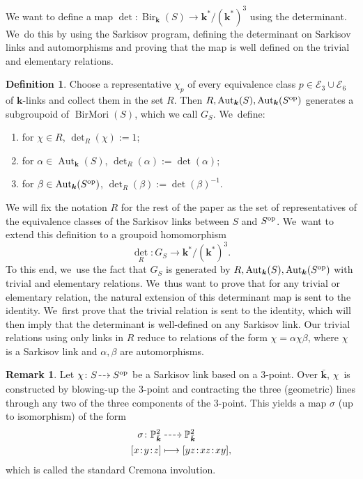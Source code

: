 \documentclass[JEP,XML,SOM,Unicode,NoFloatCountersInSection, NoEqCountersInSection,published]{cedram}
\newcommand{\dradpl}{{\hspace*{-2mm}\begin{tikzcd}[ampersand replacement=\&,column sep = scriptsize]\mbox{}\ar[r,dashed]\&\mbox{}\end{tikzcd}\hspace*{-2mm}}}
\newcommand{\dratst}{{\hspace*{-2.5mm}\begin{tikzcd}[ampersand replacement=\&,column sep = small]\mbox{}\ar[r,dashed]\&\mbox{}\end{tikzcd}\hspace*{-2mm}}}
\let\drascst\dratst
\newcommand{\dra}{\mathchoice{\dradpl}{\dratst}{\drascst}{\drascst}}
\newcommand\mto{\mathchoice{\longmapsto}{\mapsto}{\mapsto}{\mapsto}}
\newcommand{\op}{\textup{op}}
\newcommand{\sep}{\mkern2mu{:}\mkern2mu}
\theoremstyle{definition}
\newtheorem{definition}[theorem]{Definition}
\newtheorem{remark}[theorem]{Remark}
\newcommand{\kk}{{\boldsymbol{k}}}
\DeclareMathOperator{\Bir}{Bir}
\DeclareMathOperator{\Aut}{Aut}
\DeclareMathOperator{\BirMori}{BirMori}
\begin{document}
We want to define a map $\det \colon \Bir_{\kk}(S) \to \kk^* / (\kk^*)^3$ using the determinant. We~do this by using the Sarkisov program, \ie defining the determinant on Sarkisov links and automorphisms and proving that the map is well defined on the trivial and elementary relations.

\begin{definition}
Choose a representative $\chi_p$ of every equivalence class $p \in \mathcal{E}_3 \cup \mathcal{E}_6$ of $\kk$-links and collect them in the set $R$. Then $R,\Aut_{\kk}(S),\Aut_{\kk}(S^{\op})$ generates a subgroupoid of $\BirMori(S)$, which we call $G_S$. We~define:
\begin{enumerate}
\item for $\chi \in R$, $\det_R(\chi) := 1$;
\item for $\alpha \in \Aut_{\kk}(S)$, $\det_R(\alpha) := \det(\alpha)$;
\item for $\beta \in \Aut_{\kk}(S^{\op})$, $\det_R(\beta) := \det(\beta)^{-1}$.
\end{enumerate}
\end{definition}
We will fix the notation $R$ for the rest of the paper as the set of representatives of the equivalence classes of the Sarkisov links between $S$ and $S^{\op}$. We~want to extend this definition to a groupoid homomorphism
\[
\det_R\colon G_S \to \kk^*/(\kk^*)^3.
\]
To this end, we~use the fact that $G_S$ is generated by $R, \Aut_{\kk}(S), \Aut_{\kk}(S^{\op})$ with trivial and elementary relations. We~thus want to prove that for any trivial or elementary relation, the natural extension of this determinant map is sent to the identity. We~first prove that the trivial relation is sent to the identity, which will then imply that the determinant is well-defined on any Sarkisov link. Our trivial relations using only links in $R$ reduce to relations of the form $\chi = \alpha \chi \beta$, where $\chi$ is a Sarkisov link and $\alpha, \beta$ are automorphisms.

\begin{remark}
Let $\chi\colon S \dra S^{\op}$ be a Sarkisov link based on a $3$\nobreakdash-point. Over $\bar{\kk}$, $\chi$~is constructed by blowing-up the $3$\nobreakdash-point and contracting the three (geometric) lines through any two of the three components of the $3$\nobreakdash-point. This yields a map $\sigma$ (up to isomorphism) of the form
\begin{align*}
\sigma \colon \mathbb{P}^2_{\bar{\kk}}& \dra \mathbb{P}_{\bar{\kk}}^2\\
[x\sep y\sep z] &\mto [yz\sep  xz\sep  xy],
\end{align*}
which is called the standard Cremona involution.
\end{remark}
\end{document}
